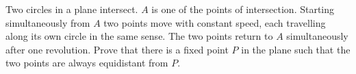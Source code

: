 Two circles in a plane intersect. $A$ is one of the points of intersection. Starting simultaneously from $A$ two points move with constant speed, each travelling along its own circle in the same sense. The two points return to $A$ simultaneously after one revolution. Prove that there is a fixed point $P$ in the plane such that the two points are always equidistant from $P.$